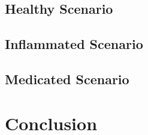 \subsection*{Healthy Scenario}
\subsection*{Inflammated Scenario}
\subsection*{Medicated Scenario}
\section{Conclusion}
